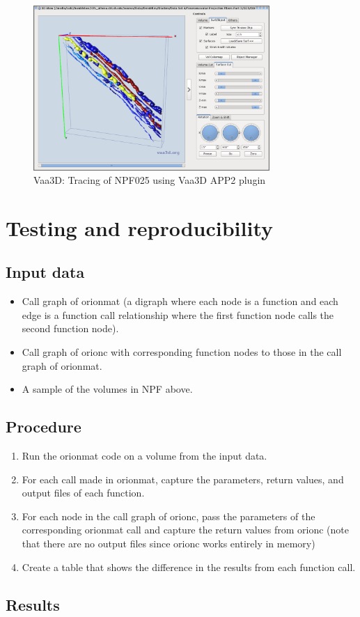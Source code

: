 \documentclass[12pt]{article}
\begin{document}
\begin{figure}[H]
\centering
\includegraphics[width=0.8\textwidth]{gfx/vaa3d_DIADEM-NPF-3-025_APP2-tracing-3D-view}
\caption{Vaa3D: Tracing of NPF025 using Vaa3D APP2 plugin}
\end{figure}

\section{Testing and reproducibility}

\subsection{Input data}

\begin{itemize}
	\item Call graph of \gls{orionmat} (a digraph where each node is a
		function and each edge is a function call relationship where the first function
		node calls the second function node).
	\item Call graph of  \gls{orionc} with corresponding function nodes to
		those in the call graph of \gls{orionmat}.
	\item A sample of the volumes in NPF above.
\end{itemize}

\subsection{Procedure}

\begin{enumerate}
	\item Run the \gls{orionmat} code on a volume from the input data.
	\item For each call made in \gls{orionmat}, capture the
		parameters, return values, and output files of each function.
	\item For each node in the call graph of \gls{orionc}, pass the
		parameters of the corresponding \gls{orionmat} call and capture
		the return values from \gls{orionc} (note that there are no
		output files since \gls{orionc} works entirely in memory)
	\item Create a table that shows the difference in the results from each
		function call.
\end{enumerate}

\subsection{Results}
\end{document}
